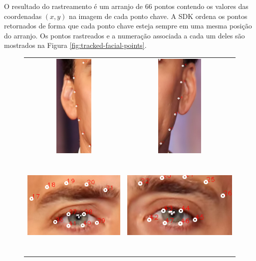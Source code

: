 O resultado do rastreamento é um arranjo de 66 pontos contendo os valores das
coordenadas $(x,y)$ na imagem de cada ponto chave. A SDK ordena os pontos
retornados de forma que cada ponto chave esteja sempre em uma mesma posição do
arranjo. Os pontos rastreados e a numeração associada a cada um deles são
mostrados na  Figura \ref{fig:tracked-facial-points}. 

\begin{figure}
\centering
\begin{tabular}{cc}
\includegraphics[width=0.4\linewidth, height=5cm]{figs/nick-marked-l-ear.png} &
\includegraphics[width=0.4\linewidth, height=5cm]{figs/nick-marked-r-ear.png} \\
\includegraphics[width=0.4\linewidth, height=5cm]{figs/nick-marked-l-eye.png} &
\includegraphics[width=0.4\linewidth, height=5cm]{figs/nick-marked-r-eye.png} \\

\end{tabular}
\end{figure}
